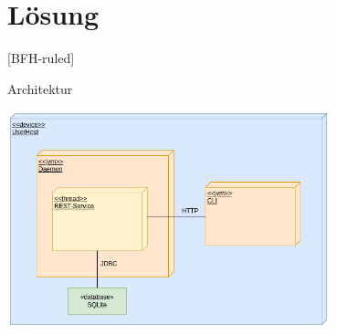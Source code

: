 \documentclass[
    ngerman,%
    authorontitle=true,
]{bfhbeamer}
\begin{document}
    \section{Lösung}\label{sec:loesung}
    [BFH-ruled]
    \frame{\sectionpage}

    \begin{frame}{Architektur}
        \begin{center}
            \includegraphics[width=0.7\textwidth]{assets/DeplDiagram-v2}
        \end{center}
    \end{frame}
\end{document}
